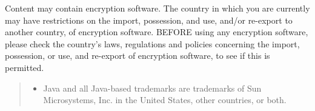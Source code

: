 Content may contain encryption software. The country in which you are currently may have restrictions on the import, possession, and use, and/or re-export to another country, of encryption software. BEFORE using any encryption software, please check the country's laws, regulations and policies concerning the import, possession, or use, and re-export of encryption software, to see if this is permitted.

\begin{quote}
  \footnotesize

  \begin{itemize}
  \item  Java and all Java-based trademarks are trademarks of Sun
    Microsystems, Inc. in the United States, other countries, or
    both.
  \end{itemize}
\end{quote}

